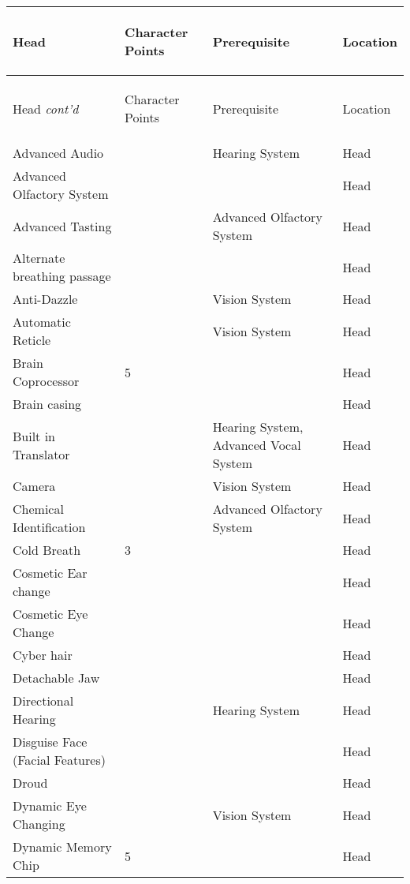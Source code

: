 \documentclass[twoside]{book}
\begin{document}
\begin{longtable}{p{1.25in}p{2em}ll} 
  Head& \begin{turn}{70}{Character Points}\end{turn}
          & \begin{turn}{70}{Prerequisite}\end{turn}
          & \begin{turn}{70}{Location}\end{turn}
          \\
  \hline
  \hline
  \endfirsthead
  Head \textit{cont'd}
        & \begin{turn}{70}{Character Points}\end{turn}
          & \begin{turn}{70}{Prerequisite}\end{turn}
          & \begin{turn}{70}{Location}\end{turn}
           \\
  \hline
  \endhead
\raggedright Advanced Audio && Hearing System & Head \tabularnewline
      \raggedright Advanced Olfactory System
           &&& Head \tabularnewline
      \raggedright Advanced Tasting && Advanced Olfactory
           System & Head \tabularnewline
      \raggedright Alternate breathing passage
           &&& Head \tabularnewline
      \raggedright Anti-Dazzle && Vision System & Head \tabularnewline
      \raggedright Automatic Reticle && Vision System & Head \tabularnewline
      \raggedright Brain Coprocessor & 5 && Head \tabularnewline
      \raggedright Brain casing &&& Head \tabularnewline
      \raggedright Built in Translator && Hearing System,
           Advanced Vocal System & Head \tabularnewline
      \raggedright Camera && Vision System & Head \tabularnewline
      \raggedright Chemical Identification
           && Advanced Olfactory
           System & Head \tabularnewline
      \raggedright Cold Breath & 3 && Head \tabularnewline
      \raggedright Cosmetic Ear change &&& Head \tabularnewline
      \raggedright Cosmetic Eye Change &&& Head \tabularnewline
      \raggedright Cyber hair &&& Head \tabularnewline
      \raggedright Detachable Jaw &&& Head \tabularnewline
      \raggedright Directional Hearing && Hearing System & Head \tabularnewline
      \raggedright Disguise Face (Facial Features)
           &&& Head \tabularnewline
      \raggedright Droud &&& Head \tabularnewline
      \raggedright Dynamic Eye Changing && Vision System & Head \tabularnewline
      \raggedright Dynamic Memory Chip & 5 && Head \tabularnewline

\end{longtable}
\end{document}
